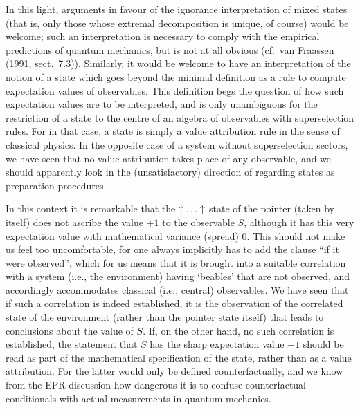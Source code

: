 In this light, arguments in favour of the ignorance interpretation of mixed
states (that is,
only those whose extremal decomposition is unique, of course) would be welcome;
such an interpretation
is necessary to comply with the empirical predictions of quantum mechanics, but
is not at all obvious
(cf.\ van Fraassen (1991, sect.\ 7.3)). Similarly, it would be welcome to have
an interpretation of
the notion of a state which goes beyond the minimal definition as a rule to
compute expectation
values of observables. This definition begs the question of how such
expectation values are to be
interpreted, and is only unambiguous for the restriction of a state to the
centre  of an algebra of
observables with superselection rules. For in that case, a state is simply a
value attribution rule
in the sense of classical physics. In the opposite case of a system without
superselection sectors,
we have seen that no value attribution takes place of any observable, and we
should apparently look
in the (unsatisfactory) direction of regarding states as preparation
procedures.

In this context it is remarkable that the $\uparrow\ldots\uparrow$ state of the pointer (taken by
itself) does not
ascribe the value $+1$ to the observable $S$, although it has this very
expectation value with
mathematical variance (spread)  0.  This should not make us feel too
uncomfortable, for one always
implicitly has to add the clause ``if it were observed'', which for us means
that it is brought into
a suitable correlation with a system (i.e., the environment) having `beables'
that are not observed,
and accordingly accommodates  classical (i.e., central) observables. We have
seen that if such a
correlation is indeed established, it is the observation of the correlated
state of the environment
(rather than the pointer state itself) that leads to conclusions about the
value of $S$. If, on the
other hand, no such correlation is established, the statement that $S$ has the
sharp expectation
value $+1$ should be  read as part of the mathematical  specification of the
state, rather than as a
value attribution. For the latter would only be defined counterfactually, and
we know from the EPR
discussion how dangerous it is to confuse counterfactual conditionals with
actual measurements in
quantum mechanics.

